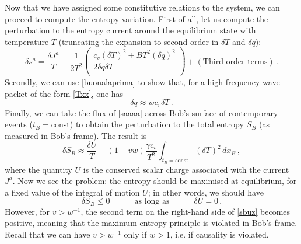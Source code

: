 \documentclass[a4paper, amsfonts, amssymb, amsmath, reprint, showkeys,  twoside, onecolumn,notitlepage,nofootinbib]{revtex4-1}
\newcommand{\spc}{\quad \quad \quad}
\theoremstyle{definition}
\theoremstyle{theorem}
\begin{document}
Now that we have assigned some constitutive relations to the system, we can proceed to compute the entropy variation. First of all, let us compute the perturbation to the entropy current around the equilibrium state with temperature $T$ (truncating the expansion to second order in $\delta T$ and $\delta q$):
\begin{equation}\label{saaaa}
\delta s^a = \dfrac{\delta J^a}{T} - \dfrac{1}{2T^2}
\begin{pmatrix}
c_v (\delta T)^2 + BT^2 (\delta q)^2   \\
2\delta q \delta T \\
\end{pmatrix} + (\text{Third order terms}) \, .
\end{equation}
Secondly, we can use \eqref{buonalaprima} to show that, for a high-frequency wave-packet of the form \eqref{Txx}, one has
\begin{equation}\label{qaaa}
\delta q \approx wc_v \delta T \, .
\end{equation}
Finally, we can take the flux of \eqref{saaaa} across Bob's surface of contemporary events ($t_B = \text{const}$) to obtain the perturbation to the total entropy $S_B$ (as measured in Bob's frame). The result is
\begin{equation}\label{sbuz}
\delta S_B \approx \dfrac{\delta U}{T} - (1-vw)\dfrac{\gamma c_v}{T^2} \int_{t_B=\text{const}} \! \! \! \! \! \! \! \!\!  (\delta T)^2 \, dx_B \, ,
\end{equation} 
where the quantity $U$ is the conserved scalar charge associated with the current $J^a$. Now we see the problem: the entropy should be maximised at equilibrium, for a fixed value of the integral of motion $U$; in other words, we should have
\begin{equation}
\delta S_B \leq 0  \spc \text{as long as} \spc \delta U=0 \, .
\end{equation}
However, for $v > w^{-1}$, the second term on the right-hand side of \eqref{sbuz} becomes positive, meaning that the maximum entropy principle is violated in Bob's frame. Recall that we can have $v>w^{-1}$ only if $w>1$, i.e. if causality is violated.
\end{document}

